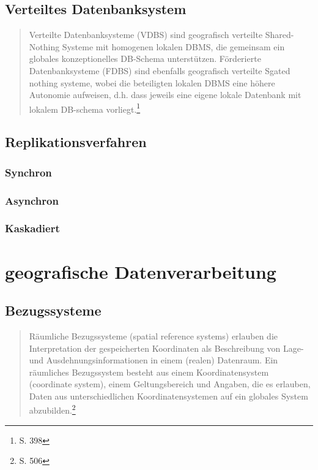 \subsection{Verteiltes Datenbanksystem}

\begin{quote}
Verteilte Datenbanksysteme (VDBS) sind geografisch verteilte Shared-Nothing Systeme mit homogenen lokalen DBMS, die gemeinsam ein globales konzeptionelles DB-Schema unterstützen.
Förderierte Datenbanksysteme (FDBS) sind ebenfalls geografisch verteilte Sgated nothing systeme, wobei die beteiligten lokalen DBMS eine höhere Autonomie aufweisen, d.h. dass jeweils eine eigene lokale Datenbank mit lokalem DB-schema vorliegt.\footnote{\cite{book:kudrass} S. 398}
\end{quote}

\subsection{Replikationsverfahren}

\subsubsection{Synchron}

\subsubsection{Asynchron}

\subsubsection{Kaskadiert}

\newpage

\section{geografische Datenverarbeitung}

\subsection{Bezugssysteme}

\begin{quote}
Räumliche Bezugssysteme (spatial reference systems) erlauben die Interpretation der gespeicherten Koordinaten als Beschreibung von Lage- und Ausdehnungsinformationen in einem (realen) Datenraum. Ein räumliches Bezugssystem besteht aus einem Koordinatensystem (coordinate system), einem Geltungsbereich und Angaben, die es erlauben, Daten aus unterschiedlichen Koordinatensystemen auf ein globales System abzubilden.\footnote{\cite{book:kudrass} S. 506}
\end{quote}

